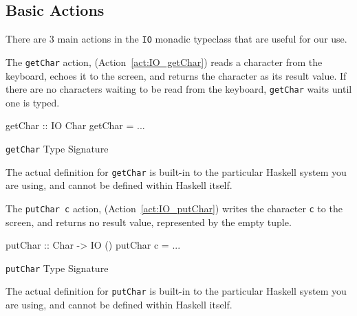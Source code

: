 \subsection{Basic \texorpdfstring{}{\texttt{IO}} Actions}\label{subsec:Basic_IO_Actions}
There are 3 main actions in the \texttt{IO} monadic typeclass that are useful for our use.
\begin{nocrefenumerate}
\item {}\label{act:IO_getChar}
\item {}\label{act:IO_putChar}
\item {}\label{act:IO_return}
\end{nocrefenumerate}

The \texttt{getChar} action, (Action~\ref{act:IO_getChar}) reads a character from the keyboard, echoes it to the screen, and returns the character as its result value.
If there are no characters waiting to be read from the keyboard, \texttt{getChar} waits until one is typed.
\begin{listing}[h!tbp]
\begin{haskellsource}
getChar :: IO Char
getChar = ...
\end{haskellsource}
\caption{\texttt{getChar} Type Signature}
\label{lst:IO_getChar_Type}
\end{listing}
The actual definition for \texttt{getChar} is built-in to the particular Haskell system you are using, and cannot be defined within Haskell itself.

The \texttt{putChar c} action, (Action~\ref{act:IO_putChar}) writes the character \texttt{c} to the screen, and returns no result value, represented by the empty tuple.
\begin{listing}[h!tbp]
\begin{haskellsource}
putChar :: Char -> IO ()
putChar c = ...
\end{haskellsource}
\caption{\texttt{putChar} Type Signature}
\label{lst:IO_putChar_Type}
\end{listing}
The actual definition for \texttt{putChar} is built-in to the particular Haskell system you are using, and cannot be defined within Haskell itself.


